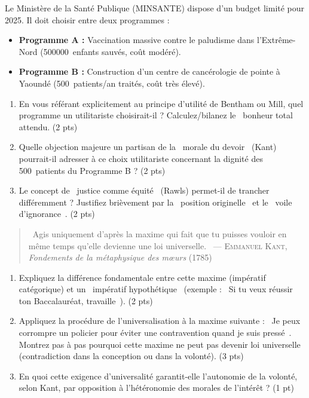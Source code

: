 \documentclass[11pt]{article}
\begin{document}
\begin{exercice}
Le Ministère de la Santé Publique (MINSANTE) dispose d'un budget limité pour \SI{2025}{}. Il doit choisir entre deux programmes : 
\begin{itemize}
    \item \textbf{Programme A :} Vaccination massive contre le paludisme dans l'Extrême-Nord (\SI{500 000}{enfants} sauvés, coût modéré).
    \item \textbf{Programme B :} Construction d'un centre de cancérologie de pointe à Yaoundé (\SI{500}{patients/an} traités, coût très élevé).
\end{itemize}
\begin{enumerate}
    \item En vous référant explicitement au principe d'utilité de Bentham ou Mill, quel programme un utilitariste choisirait-il ? Calculez/bilanez le \og~bonheur total~\fg{} attendu. (2 pts)
    \item Quelle objection majeure un partisan de la \og~morale du devoir~\fg{} (Kant) pourrait-il adresser à ce choix utilitariste concernant la dignité des \SI{500}{patients} du Programme B ? (2 pts)
    \item Le concept de \og~justice comme équité~\fg{} (Rawls) permet-il de trancher différemment ? Justifiez brièvement par la \og~position originelle~\fg{} et le \og~voile d'ignorance~\fg{}. (2 pts)
\end{enumerate}
\end{exercice}

\begin{exercice}
\begin{quote}
\og~Agis uniquement d'après la maxime qui fait que tu puisses vouloir en même temps qu'elle devienne une loi universelle.~\fg{} 
\hfill --- \textsc{Emmanuel Kant}, \textit{Fondements de la métaphysique des mœurs} (1785)
\end{quote}
\begin{enumerate}
    \item Expliquez la différence fondamentale entre cette maxime (impératif catégorique) et un \og~impératif hypothétique~\fg{} (exemple : \og~Si tu veux réussir ton Baccalauréat, travaille~\fg{}). (2 pts)
    \item Appliquez la procédure de l'universalisation à la maxime suivante : \og~Je peux corrompre un policier pour éviter une contravention quand je suis pressé~\fg{}. Montrez pas à pas pourquoi cette maxime ne peut pas devenir loi universelle (contradiction dans la conception ou dans la volonté). (3 pts)
    \item En quoi cette exigence d'universalité garantit-elle l'autonomie de la volonté, selon Kant, par opposition à l'hétéronomie des morales de l'intérêt ? (1 pt)
\end{enumerate}
\end{exercice}
\end{document}
